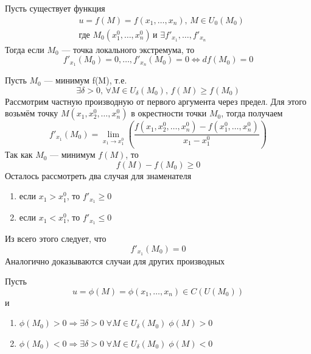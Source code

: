 	\begin{Th}
		Пусть существует функция 
        \begin{align*}
            &u = f(M) = f(x_1, \dots, x_n), \, M \in U_0(M_0)\\
            &\text{где }  M_0(x^0_1, \dots, x^0_n) \, \text{и } \exists f'_{x_1}, \dots, f'_{x_n}
        \end{align*}
		Тогда если $M_0$ --- точка локального экстремума, то 
        \[
            f'_{x_1}(M_0) = 0, \dots, f'_{x_n}(M_0) = 0 \Leftrightarrow df(M_0) = 0
        \]
	\end{Th}
	\begin{Proof}
		Пусть $M_0$ --- минимум f(M), т.е. 
        \[
            \exists \delta > 0, \, \forall M \in U_\delta(M_0), \, f(M) \geqslant f(M_0)
        \]
		Рассмотрим частную производную от первого аргумента через предел. Для этого возьмём точку $M(x_1, x^0_2, \dots, x^0_n)$ в окрестности точки $M_0$, тогда получаем\\
		\[
            f'_{x_1}(M_0) = \lim_{x_1 \to x^0_1}(\frac{f(x_1, x^0_2, \dots, x^0_n) - f(x^0_1, \dots, x^0_n)}{x_1 - x^0_1})
        \]
		Так как $M_0$ ---  минимум $f(M)$, то 
        \[
            f(M) - f(M_0) \geqslant 0
        \]
		Осталось рассмотреть два случая для знаменателя
		\begin{enumerate}
			\item если $x_1 > x^0_1$, то $f'_{x_1} \geqslant 0$
			\item если $x_1 < x^0_1$, то $f'_{x_1} \leqslant 0$
		\end{enumerate}
		Из всего этого следует, что 
        \[
            f'_{x_1}(M_0) = 0
        \] 
		Аналогично доказываются случаи для других производных
	\end{Proof}


	\begin{Lem}
		Пусть 
        \[
            u = \phi (M) = \phi (x_1, \dots, x_n) \in C(U(M_0))
        \]
        и
		\begin{enumerate}
			\item $\phi (M_0) > 0 \Rightarrow \exists \delta > 0 \; \forall M \in U_\delta (M_0) \; \phi (M) > 0$
			
            \item $\phi (M_0) < 0 \Rightarrow \exists \delta > 0 \; \forall M \in U_\delta (M_0) \; \phi (M) < 0$
		\end{enumerate}
	\end{Lem}

